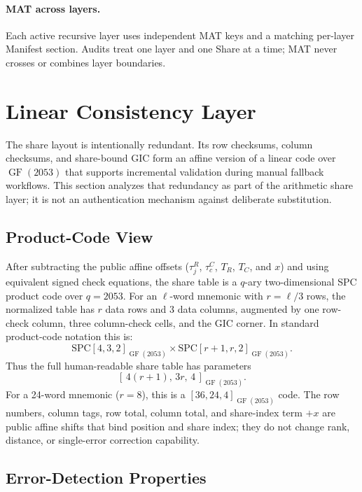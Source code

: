 \documentclass[11pt]{article}
\newcommand{\GF}{\operatorname{GF}}
\begin{document}
\paragraph{MAT across layers.} Each active recursive layer uses independent MAT keys and a matching per-layer Manifest section. Audits treat one layer and one Share at a time; MAT never crosses or combines layer boundaries.

\section{Linear Consistency Layer}
\label{sec:integrity}

The share layout is intentionally redundant. Its row checksums, column checksums, and share-bound GIC form an affine version of a linear code over $\GF(2053)$ that supports incremental validation during manual fallback workflows. This section analyzes that redundancy as part of the arithmetic share layer; it is not an authentication mechanism against deliberate substitution.

\subsection{Product-Code View}
\label{sec:linear-consistency}

After subtracting the public affine offsets ($\tau^R_j$, $\tau^C_c$, $T_R$, $T_C$, and $x$) and using equivalent signed check equations, the share table is a $q$-ary two-dimensional SPC product code over $q=2053$. For an $\ell$-word mnemonic with $r = \ell/3$ rows, the normalized table has $r$ data rows and 3 data columns, augmented by one row-check column, three column-check cells, and the GIC corner. In standard product-code notation this is:
\[
    \mathrm{SPC}[4,3,2]_{\GF(2053)} \times \mathrm{SPC}[r{+}1,r,2]_{\GF(2053)}.
\]
Thus the full human-readable share table has parameters
\[
    [\,4(r{+}1),\,3r,\,4\,]_{\GF(2053)}.
\]
For a 24-word mnemonic ($r=8$), this is a $[36,24,4]_{\GF(2053)}$ code. The row numbers, column tags, row total, column total, and share-index term $+x$ are public affine shifts that bind position and share index; they do not change rank, distance, or single-error correction capability.

\subsection{Error-Detection Properties}
\end{document}
